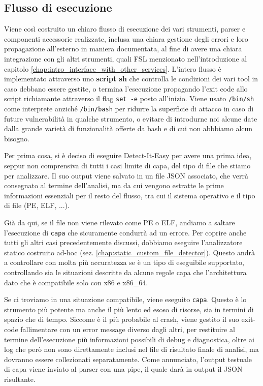 \subsection{Flusso di esecuzione}
Viene così costruito un chiaro flusso di esecuzione dei vari strumenti, parser e componenti accessorie realizzate, inclusa una chiara gestione degli errori e loro propagazione all'esterno in maniera documentata, al fine di avere una chiara integrazione con gli altri strumenti, quali FSL menzionato nell'introduzione al capitolo \ref{chap:intro_interface_with_other_services}. L'intero flusso è implementato attraverso uno \textbf{script sh} che controlla le condizioni dei vari tool in caso debbano essere gestite, o termina l'esecuzione propagando l'exit code allo script richiamante attraverso il flag \texttt{set -e} posto all'inizio.
Viene usato \texttt{/bin/sh} come interprete anziché \texttt{/bin/bash} per ridurre la superficie di attacco in caso di future vulnerabilità in qualche strumento, o evitare di introdurne noi alcune date dalla grande varietà di funzionalità offerte da bash e di cui non abbbiamo alcun bisogno.

Per prima cosa, si è deciso di eseguire Detect-It-Easy per avere una prima idea, seppur non comprensiva di tutti i casi limite di capa, del tipo di file che stiamo per analizzare. Il suo output viene salvato in un file JSON associato, che verrà consegnato al termine dell'analisi, ma da cui vengono estratte le prime informazioni essenziali per il resto del flusso, tra cui il sistema operativo e il tipo di file (PE, ELF, ...).

Già da qui, se il file non viene rilevato come PE o ELF, andiamo a saltare l'esecuzione di \texttt{capa} che sicuramente condurrà ad un errore.
Per coprire anche tutti gli altri casi precedentemente discussi, dobbiamo eseguire l'analizzatore statico costruito ad-hoc (sez. \ref{chap:static_custom_file_detector}). Questo andrà a controllare con molta più accuratezza se è un tipo di eseguibile supportato,
controllando sia le situazioni descritte da alcune regole capa che l'architettura dato che è compatibile solo con x86 e x86\_64.

Se ci troviamo in una situazione compatibile, viene eseguito \texttt{capa}. Questo è lo strumento più potente ma anche il più lento ed esoso di risorse, sia in termini di spazio che di tempo. Siccome è il più probabile al crash, viene gestito il suo exit-code fallimentare con un error message diverso dagli altri, per restituire al termine dell'esecuzione più informazioni possibili di debug e diagnostica, oltre ai log che però non sono direttamente inclusi nel file di risultato finale di analisi, ma dovranno essere collezionati separatamente.
Come annunciato, l'output testuale di capa viene inviato al parser con una pipe, il quale darà in output il JSON risultante.

